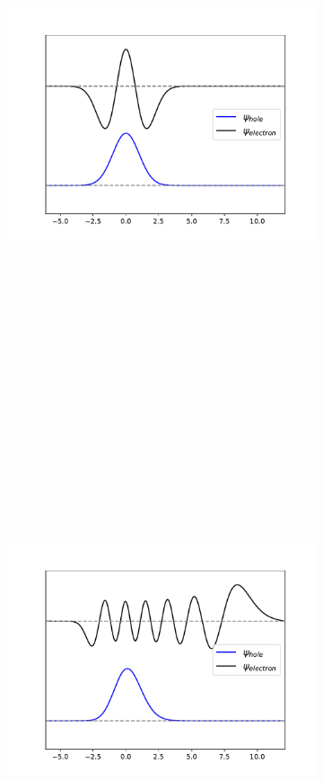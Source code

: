 \documentclass[20pt,margin=1in,innermargin=-4.5in,blockverticalspace=-0.25in]{tikzposter}
\begin{document}
\begin{columns}
{\begin{figure}[H]
\begin{subfigure}
          \centering
          \includegraphics[height=6.0in]{../plots/harmonic_ntos.pdf}
      \end{subfigure}
      \hspace{-2.5cm}
      \begin{subfigure}
          \centering
          \includegraphics[height=6.0in]{../plots/morse_ntos.pdf}

\end{subfigure}
\end{figure}}
\end{columns}
\end{document}
